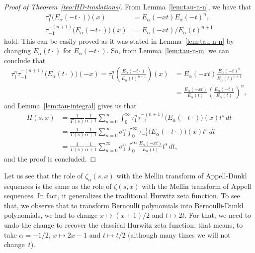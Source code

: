 \documentclass[a4paper]{amsart}
\newcommand{\Ea}{E_{\alpha}}
\theoremstyle{plain}
\theoremstyle{definition}
\theoremstyle{remark}
\numberwithin{equation}{section}
\begin{document}
\begin{proof}[Proof of Theorem~\ref{teo:HD-traslations}]
From Lemma~\ref{lem:tau-n-n}, we have that
\begin{align*}
\tau_{1}^n \big( \Ea(-t\cdot) \big)(x) & = \Ea(-xt)\Ea(-t)^n, \\
\tau_{-1}^{-(n+1)} \big( \Ea(-t\cdot) \big)(x) & = \Ea(-xt)/ \Ea(t)^{n+1}
\end{align*}
hold. This can be easily proved as it was stated in Lemma~\ref{lem:tau-n-n} by changing $\Ea(t\cdot)$ for $\Ea(-t\cdot)$. So, from Lemma~\ref{lem:tau-n-m} we can conclude that
\begin{align*}
\tau_{1}^n \tau_{-1}^{-(n+1)} \big( \Ea(t\cdot) \big)(-x) = 
\tau_{1}^n \left( \frac{\Ea(-t\cdot)}{\Ea(t)^{n+1}} \right) (x) 
& = \Ea(-xt)\frac{\Ea(-t)^n}{\Ea(t)^{n+1}}   \\
& = \frac{\Ea(-xt)}{\Ea(t)}\left(\frac{\Ea(-t)}{\Ea(t)}\right)^n,
\end{align*}
and Lemma~\ref{lem:tau-integral} gives us that
\begin{align*}
H(s,x) & = \frac{1}{\Gamma(s)} \frac{1}{\alpha+1}
\sum_{n=0}^{\infty} \int_{0}^{\infty} \tau_{1}^n \tau_{-1}^{-(n+1)}
\big( \Ea(-t\cdot) \big)(x) t^{s} \,dt \\
&  = \frac{1}{\Gamma(s)} \frac{1}{\alpha+1}
\sum_{n=0}^{\infty} \sigma_1^n  
\int_{0}^{\infty} \tau_{-1}^{-1} \big( \Ea(-t\cdot) \big)(x) t^{s} \,dt  \\
&  = \frac{1}{\Gamma(s)} \frac{1}{\alpha+1} 
\sum_{n=0}^{\infty} \sigma_1^n 
\int_{0}^{\infty} \frac{\Ea(-xt)}{\Ea(t)} t^{s} \,dt,
\end{align*}
and the proof is concluded.
\end{proof}

Let us see that the role of $\zeta_{\alpha}(s,x)$ with the Mellin transform of Appell-Dunkl sequences is the same as the role of $\zeta(s,x)$ with the Mellin transform of Appell sequences. In fact, it generalizes the traditional Hurwitz zeta function. To see that, we observe that to transform Bernoulli polynomials into Bernoulli-Dunkl polynomials, we had to change $x \mapsto (x+1)/2$ and $t \mapsto 2t$. For that, we need to undo the change to recover the classical Hurwitz zeta function, that means, to take $\alpha=-1/2$, $x\mapsto 2x-1$ and $t\mapsto t/2$ (although many times we will not change~$t$). 
\end{document}
